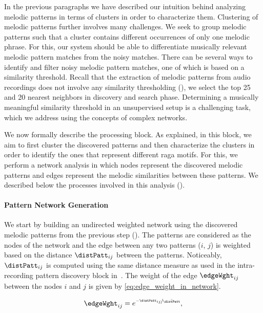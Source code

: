 {In the previous paragraphs we have described our intuition behind analyzing melodic patterns in terms of clusters in order to characterize them. Clustering of melodic patterns further involves many challenges. We seek to group melodic patterns such that a cluster contains different occurrences of only one melodic phrase. For this, our system should be able to differentiate musically relevant melodic pattern matches from the noisy matches. There can be several ways to identify and filter noisy melodic pattern matches, one of which is based on a similarity threshold. Recall that the extraction of melodic patterns from audio recordings does not involve any similarity thresholding (), we select the top 25 and 20 nearest neighbors in discovery and search phase. Determining a musically meaningful similarity threshold in an unsupervised setup is a challenging task, which we address using the concepts of complex networks. 
 
We now formally describe the processing block. As explained, in this block, we aim to first cluster the discovered patterns and then characterize the clusters in order to identify the ones that represent different \gls{raga} motifs. For this, we perform a network analysis in which nodes represent the discovered melodic patterns and edges represent the melodic similarities between these patterns. We described below the processes involved in this analysis (). 


\paragraph{Pattern Network Generation}
\label{sec:network_generation}

We start by building an undirected weighted network using the discovered melodic patterns from the previous step (). The patterns are considered as the nodes of the network and the edge between any two patterns ($i$, $j$) is weighted based on the distance $\distPatt_{ij}$ between the patterns. Noticeably, $\distPatt_{ij}$ is computed using the same distance measure as used in the intra-recording pattern discovery block in~. The weight of the edge $\edgeWght_{ij}$ between the nodes $i$ and $j$ is given by \eqref{eq:edge_weight_in_network}. 

\begin{equation}
\edgeWght_{ij} = e^{\nicefrac{-\distPatt_{ij}}{\bar{\distPatt}}},
\label{eq:edge_weight_in_network}
\end{equation}

}
